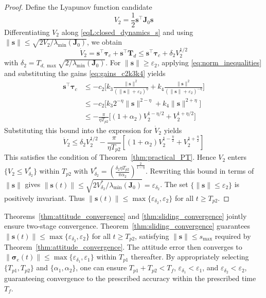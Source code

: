 \documentclass[journal]{new-aiaa}
\begin{document}
\begin{proof}
Define the Lyapunov function candidate
\begin{equation}
V_2 = \frac{1}{2}\boldsymbol{s}^\top\boldsymbol{J}_0\boldsymbol{s}
\end{equation}
Differentiating $V_2$ along \eqref{eqL:closed_dynamics_s} and using
$\|\boldsymbol{s}\| \le \sqrt{2V_2/\lambda_{\min}(\boldsymbol{J}_0)}$, we obtain
\begin{equation}
\dot{V}_2 = \boldsymbol{s}^\top\boldsymbol{\tau}_c + \boldsymbol{s}^\top\boldsymbol{T}_d
\le \boldsymbol{s}^\top\boldsymbol{\tau}_c + \delta_2 V_2^{1/2}
\end{equation}
with $\delta_2 = T_{d,\max}\sqrt{2/\lambda_{\min}(\boldsymbol{J}_0)}$.
For $\|\boldsymbol{s}\| \ge \varepsilon_2$, applying \eqref{eq:norm_inequalities} and substituting the gains \eqref{eq:gains_c2k3k4} yields
\begin{align}
\boldsymbol{s}^\top\boldsymbol{\tau}_c
&\le -c_2\Big[k_3\frac{\|\boldsymbol{s}\|^2}{(\|\boldsymbol{s}\|+\varepsilon_2)^\eta}
+ k_4\frac{\|\boldsymbol{s}\|^2}{(\|\boldsymbol{s}\|+\varepsilon_2)^{-\eta}}\Big] \nonumber \\
&\le -c_2\big[k_3 2^{-\eta}\|\boldsymbol{s}\|^{2-\eta} + k_4 \|\boldsymbol{s}\|^{2+\eta}\big] \nonumber \\
&\le -\frac{\pi}{\eta T_{p2}}\big[(1+\alpha_2)V_2^{1-\eta/2} + V_2^{1+\eta/2}\big]
\end{align}
Substituting this bound into the expression for $\dot{V}_2$ yields
\begin{equation}
\dot{V}_2 \le \delta_2 V_2^{1/2}
- \frac{\pi}{\eta T_{p2}}\left[(1+\alpha_2)V_2^{1-\frac{\eta}{2}} + V_2^{1+\frac{\eta}{2}}\right]
\label{eq:V2dot_final}
\end{equation}
This satisfies the condition of Theorem~\ref{thm:practical_PT}. Hence $V_2$ enters $\{V_2\le V^*_{\delta_2}\}$ within $T_{p2}$ with
$V^*_{\delta_2} = (\frac{\delta_2\eta T_{p2}}{\pi\alpha_2})^{\frac{2}{1-\eta}}$.
Rewriting this bound in terms of $\|\boldsymbol{s}\|$ gives $\|\boldsymbol{s}(t)\| \le \sqrt{2V^*_{\delta_2}/\lambda_{\min}(\boldsymbol{J}_0)} = \varepsilon_{\delta_2}$.
The set $\{\|\boldsymbol{s}\|\le\varepsilon_2\}$ is positively invariant.
Thus $\|\boldsymbol{s}(t)\| \le \max\{\varepsilon_{\delta_2},\varepsilon_2\}$ for all $t\ge T_{p2}$.
\end{proof}

Theorems~\ref{thm:attitude_convergence} and \ref{thm:sliding_convergence} jointly ensure two-stage convergence.
Theorem~\ref{thm:sliding_convergence} guarantees $\|\boldsymbol{s}(t)\|\le\max\{\varepsilon_{\delta_2},\varepsilon_2\}$
for all $t\ge T_{p2}$, satisfying $\|\boldsymbol{s}\|\le s_{\max}$ required by
Theorem~\ref{thm:attitude_convergence}.
The attitude error then converges to $\|\boldsymbol{\sigma}_e(t)\|\le\max\{\varepsilon_{\delta_1},\varepsilon_1\}$
within $T_{p1}$ thereafter.
By appropriately selecting $\{T_{p1},T_{p2}\}$ and $\{\alpha_1,\alpha_2\}$, one can ensure
$T_{p1}+T_{p2}<T_f$, $\varepsilon_{\delta_1}<\varepsilon_1$, and $\varepsilon_{\delta_2}<\varepsilon_2$,
guaranteeing convergence to the prescribed accuracy within the prescribed time $T_f$.
\end{document}
